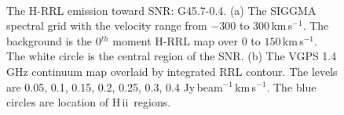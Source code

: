\documentclass[manuscript]{aastex61}
\newcommand{\hii}{{\rm H\,}{{\sc ii}}}
\newcommand{\kms}{\,km\,s$^{-1}$}
\begin{document}
\begin{figure}[H]
	\centering
	\\
	\caption{The H-RRL emission toward SNR: G45.7-0.4.
	(a) The SIGGMA spectral grid with the velocity range from $-300$ to $300$\kms.
	The background is the 0$^{th}$ moment H-RRL map over $0$ to $150$\kms.
	The white circle is the central region of the SNR.
	(b) The VGPS 1.4 GHz continuum map overlaid by integrated RRL contour.
	The levels are 0.05, 0.1, 0.15, 0.2, 0.25, 0.3, 0.4 Jy\,beam$^{-1}$\kms.
	The blue circles are location of \hii\ regions.
	}
	\label{fig_snr-g457}
\end{figure}
\end{document}
